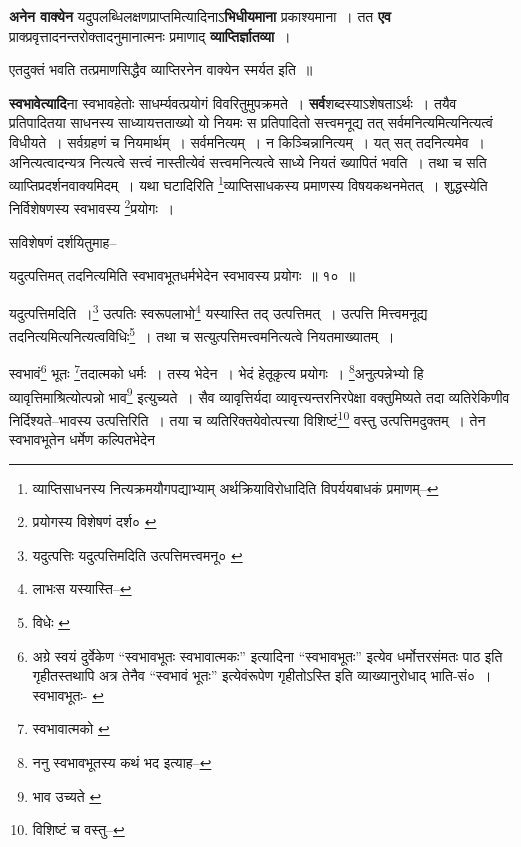 \documentclass[article,12pt,a4paper]{memoir}
\begin{document}
	  \pstart \textbf{अनेन वाक्येन} यदुपलब्धिलक्षणप्राप्तमित्यादिनाऽ\textbf{भिधीयमाना} प्रकाश्यमाना । तत \textbf{एव} प्राक्प्रवृत्तादनन्तरोक्तादनुमानात्मनः प्रमाणाद् \textbf{व्याप्तिर्ज्ञातव्या} ।
	\pend
      

	  \pstart एतदुक्तं भवति तत्प्रमाणसिद्धैव व्याप्तिरनेन वाक्येन स्मर्यत इति ॥
	\pend
      

	  \pstart \textbf{स्वभावेत्यादि}ना स्वभावहेतोः साधर्म्यवत्प्रयोगं विवरितुमुपक्रमते । \textbf{सर्व}शब्दस्याऽशेषताऽर्थः । तयैव प्रतिपादितया साधनस्य साध्यायत्तताख्यो यो नियमः स प्रतिपादितो  \leavevmode{} सत्त्वमनूद्य तत् सर्वमनित्यमित्यनित्यत्वं विधीयते । सर्वग्रहणं च नियमार्थम् । सर्वमनित्यम् । न किञ्चिन्नानित्यम् । यत् सत् तदनित्यमेव । अनित्यत्वादन्यत्र नित्यत्वे सत्त्वं नास्तीत्येवं सत्त्वमनित्यत्वे साध्ये नियतं ख्यापितं भवति । तथा च सति व्याप्तिप्रदर्शनवाक्यमिदम् । यथा घटादिरिति \footnote{व्याप्तिसाधनस्य \cite{dp-msA} \cite{dp-msB} \cite{dp-msC} \cite{dp-msD} \cite{dp-edP} \cite{dp-edH} \cite{dp-edE} \cite{dp-edN} नित्यक्रमयौगपद्याभ्याम् अर्थक्रियाविरोधादिति विपर्ययबाधकं प्रमाणम्--\cite{dp-msD-n}}व्याप्तिसाधकस्य प्रमाणस्य विषयकथनमेतत् । शुद्धस्येति निर्विशेषणस्य स्वभावस्य \footnote{प्रयोगस्य विशेषणं दर्श० \cite{dp-msB}}प्रयोगः ।
	\pend
      

	  \pstart सविशेषणं दर्शयितुमाह--
	\pend
      
	  \bigskip
	  \begingroup
	

	  \pstart यदुत्पत्तिमत् तदनित्यमिति स्वभावभूतधर्मभेदेन स्वभावस्य प्रयोगः ॥ १० ॥
	\pend
      
	  \endgroup
	
	  \bigskip
	  \begingroup
	

	  \pstart यदुत्पत्तिमदिति ।\footnote{यदुत्पत्तिः \cite{dp-msC} यदुत्पत्तिमदिति उत्पत्तिमत्त्वमनू० \cite{dp-msA}} उत्पतिः स्वरूपलाभो\footnote{लाभःस यस्यास्ति--\cite{dp-msB}} यस्यास्ति तद् उत्पत्तिमत् । उत्पत्ति मित्त्वमनूद्य तदनित्यमित्यनित्यत्वविधिः\footnote{विधेः \cite{dp-msA} \cite{dp-edP} \cite{dp-edH}} । तथा च सत्युत्पत्तिमत्त्वमनित्यत्वे नियतमाख्यातम् ।
	\pend
       

	  \pstart स्वभावं\footnote{अग्रे स्वयं दुर्वेकेण “स्वभावभूतः स्वभावात्मकः” इत्यादिना “स्वभावभूतः” इत्येव धर्मोत्तरसंमतः पाठ इति गृहीतस्तथापि अत्र तेनैव “स्वभावं भूतः” इत्येवंरूपेण गृहीतोऽस्ति इति व्याख्यानुरोधाद् भाति-सं० । स्वभावभूतः-\cite{dp-msA} \cite{dp-msB} \cite{dp-msC} \cite{dp-msD} \cite{dp-edP} \cite{dp-edH} \cite{dp-edE} \cite{dp-edN}} भूतः \footnote{स्वभावात्मको \cite{dp-msA} \cite{dp-msB} \cite{dp-msC} \cite{dp-msD} \cite{dp-edP} \cite{dp-edH} \cite{dp-edE} \cite{dp-edN}}तदात्मको धर्मः । तस्य भेदेन । भेदं हेतूकृत्य प्रयोगः । \footnote{ननु स्वभावभूतस्य कथं भद इत्याह--\cite{dp-msD-n}}अनुत्पन्नेभ्यो हि व्यावृत्तिमाश्रित्योत्पन्नो भाव\footnote{भाव उच्यते \cite{dp-msA} \cite{dp-msB} \cite{dp-msD} \cite{dp-edP} \cite{dp-edH} \cite{dp-edE} \cite{dp-edN}} इत्युच्यते । सैव व्यावृत्तिर्यदा व्यावृत्त्यन्तरनिरपेक्षा वक्तुमिष्यते तदा व्यतिरेकिणीव निर्दिश्यते--भावस्य उत्पत्तिरिति । तया च व्यतिरिक्तयेवोत्पत्त्या विशिष्टं\footnote{विशिष्टं च वस्तु--\cite{dp-msC}} वस्तु उत्पत्तिमदुक्तम् । तेन स्वभावभूतेन धर्मेण कल्पितभेदेन
	\pend
      
\end{document}
